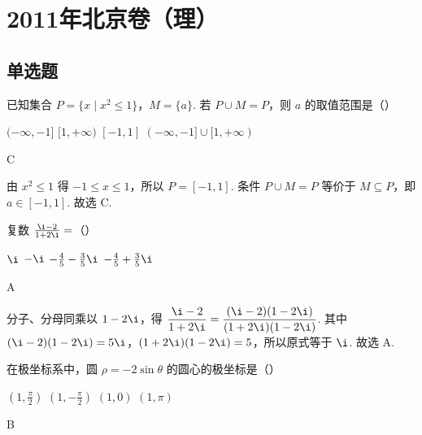 \chapter{2011年北京卷（理）}

\section{单选题}

\begin{problem}
已知集合 \(P = \{x \mid x^2 \leqslant 1\}\)，\(M = \{a\}\). 若 \(P \cup M = P\)，则 \(a\) 的取值范围是（\quad）

\choices
    {\((- \infty, -1]\)}
    {\([1, +\infty)\)}
    {\([-1, 1]\)}
    {\((- \infty, -1] \cup [1, +\infty)\)}
\end{problem}

\begin{answer}
C
\end{answer}

\begin{solution}
由 \(x^2\leqslant 1\) 得 \(-1\leqslant x\leqslant 1\)，所以 \(P=[-1,1]\). 条件 \(P\cup M=P\) 等价于 \(M\subseteq P\)，即 \(a\in[-1,1]\). 故选 C.
\end{solution}

\begin{problem}
复数 \(\frac{\i-2}{1+2\i}=\)（\quad）

\choices
    {\(\i\)}
    {\(-\i\)}
    {\(-\frac{4}{5} - \frac{3}{5}\i\)}
    {\(-\frac{4}{5} + \frac{3}{5}\i\)}
\end{problem}

\begin{answer}
A
\end{answer}

\begin{solution}
分子、分母同乘以 \(1-2\i\)，得 \(\dfrac{\i-2}{1+2\i}=\dfrac{(\i-2)(1-2\i)}{(1+2\i)(1-2\i)}\). 其中 \((\i-2)(1-2\i)=5\i\)，\((1+2\i)(1-2\i)=5\)，所以原式等于 \(\i\). 故选 A.
\end{solution}

\begin{problem}
在极坐标系中，圆 \(\rho = -2\sin \theta\) 的圆心的极坐标是（\quad）

\choices
    {\(\left(1, \frac{\pi}{2}\right)\)}
    {\(\left(1, -\frac{\pi}{2}\right)\)}
    {\((1, 0)\)}
    {\((1, \pi)\)}
\end{problem}

\begin{answer}
B
\end{answer}

